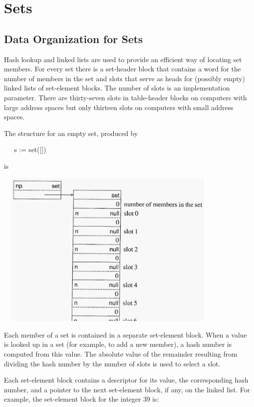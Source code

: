 \section{Sets}
\subsection{Data Organization for Sets}

Hash lookup and linked lists are used to provide an efficient way of
locating set members. For every set there is a set-header block that
contains a word for the number of members in the set and slots that
serve as heads for (possibly empty) linked lists of set-element
blocks. The number of slots is an implementation parameter. There are
thirty-seven slots in table-header blocks on computers with large
address spaces but only thirteen slots on computers with small address
spaces.

The structure for an empty set, produced by

\ \ \ s := set([])

\noindent is

\ \  \includegraphics[width=4.1681in,height=3.0484in]{ib-img/ib-img034.jpg} 

Each member of a set is contained in a separate set-element
block. When a value is looked up in a set (for example, to add a new
member), a hash number is computed from this value. The absolute value
of the remainder resulting from dividing the hash number by the number
of slots is used to select a slot.

Each set-element block contains a descriptor for its value, the
corresponding hash number, and a pointer to the next set-element
block, if any, on the linked list. For example, the set-element block
for the integer 39 is:

